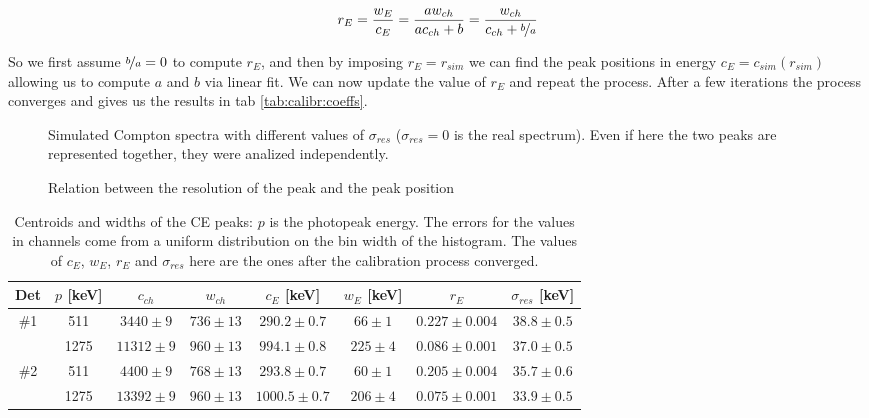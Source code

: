\documentclass[11pt,a4 paper]{article}
\let\oldfrac\frac
\renewcommand{\frac}[3][d]{\ifthenelse{\equal{#1}{d}}{\oldfrac{#2}{#3}}{\nicefrac{#2}{#3}}}
\begin{document}
\begin{equation*}
  r_E = \frac{w_E}{c_E} = \frac{a w_{ch}}{a c_{ch} + b} = \frac{w_{ch}}{c_{ch} + \frac[f]{b}{a}}
\end{equation*}

So we first assume $\frac[f]{b}{a} = 0$ to compute $r_E$, and then by imposing $r_E = r_{sim}$ we can find the peak positions in energy $c_E = c_{sim}(r_{sim})$ allowing us to compute $a$ and $b$ via linear fit. We can now update the value of $r_E$ and repeat the process. After a few iterations the process converges and gives us the results in tab \ref{tab:calibr:coeffs}.

\begin{figure}
  \centering
  \caption{Simulated Compton spectra with different values of $\sigma_{res}$ ($\sigma_{res} = 0$ is the real spectrum). Even if here the two peaks are represented together, they were analized independently.}
  \label{fig:sim:spectra}
\end{figure}

\begin{figure}[H]
    \centering
    \caption{Relation between the resolution of the peak and the peak position}
    \label{fig:sim}
\end{figure}




\begin{table}[H]
  \centering
  \begin{tabular}{cccccccc}
    \toprule
    Det & $p$ [keV] & $c_{ch}$ & $w_{ch}$ & $c_E$ [keV] & $w_E$ [keV] & $r_E$ & $\sigma_{res}$ [keV]\\
    \midrule
    \#1 & 511 & $3440 \pm 9$ & $736 \pm 13$ & $290.2 \pm 0.7$ & $66 \pm 1$ & $0.227 \pm 0.004$ & $38.8 \pm 0.5$ \\
        & 1275 & $11312 \pm 9$ & $960 \pm 13$ & $994.1 \pm 0.8$ & $225 \pm 4$ & $0.086 \pm 0.001$ & $37.0 \pm 0.5$ \\
    \#2 & 511 & $4400 \pm 9$ & $768 \pm 13$ & $293.8 \pm 0.7$ & $60 \pm 1$ & $0.205 \pm 0.004$ & $35.7 \pm 0.6$ \\
        & 1275 & $13392 \pm 9$ & $960 \pm 13$ & $1000.5 \pm 0.7$ & $206 \pm 4$ & $0.075 \pm 0.001$ & $33.9 \pm 0.5$ \\
    \bottomrule
  \end{tabular}
  \caption{Centroids and widths of the CE peaks: $p$ is the photopeak energy. The errors for the values in channels come from a uniform distribution on the bin width of the histogram. The values of $c_E$, $w_E$, $r_E$ and $\sigma_{res}$ here are the ones after the calibration process converged.}
  \label{tab:calibr:fits}
\end{table}
\end{document}

